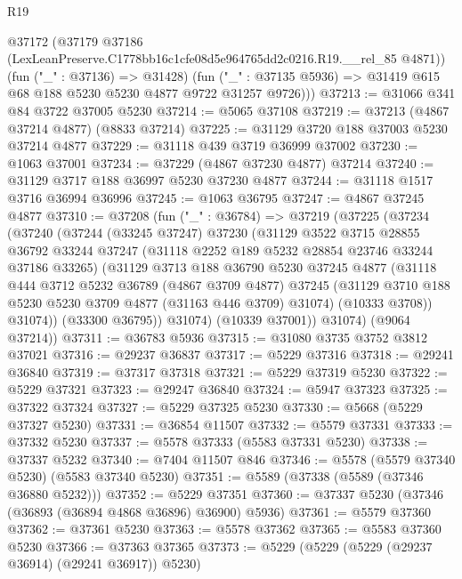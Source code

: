 \begin{lexlean}{R19}
\begin{coremodule}
      @37172
        (@37179 @37186 (LexLeanPreserve.C1778bb16c1cfe08d5e964765dd2c0216.R19.__rel_85 @4871))
        (fun ("_" : @37136) => @31428)
        (fun ("_" : @37135 @5936) => @31419 @615 @68 @188 @5230 @5230 @4877 @9722 @31257 @9726)))
@37213 := @31066 @341 @84 @3722 @37005 @5230
@37214 := @5065 @37108
@37219 := @37213 (@4867 @37214 @4877) (@8833 @37214)
@37225 := @31129 @3720 @188 @37003 @5230 @37214 @4877
@37229 := @31118 @439 @3719 @36999 @37002
@37230 := @1063 @37001
@37234 := @37229 (@4867 @37230 @4877) @37214
@37240 := @31129 @3717 @188 @36997 @5230 @37230 @4877
@37244 := @31118 @1517 @3716 @36994 @36996
@37245 := @1063 @36795
@37247 := @4867 @37245 @4877
@37310 := @37208
    (fun ("_" : @36784) =>
    @37219
      (@37225
        (@37234
          (@37240
            (@37244
              (@33245 @37247)
              @37230
              (@31129
                @3522
                @3715
                @28855
                @36792
                @33244
                @37247
                (@31118 @2252 @189 @5232 @28854 @23746 @33244 @37186 @33265)
                (@31129
                  @3713
                  @188
                  @36790
                  @5230
                  @37245
                  @4877
                  (@31118
                    @444
                    @3712
                    @5232
                    @36789
                    (@4867 @3709 @4877)
                    @37245
                    (@31129 @3710 @188 @5230 @5230 @3709 @4877 (@31163 @446 @3709) @31074)
                    (@10333 @3708))
                  @31074))
              (@33300 @36795))
            @31074)
          (@10339 @37001))
        @31074)
      (@9064 @37214))
@37311 := @36783 @5936
@37315 := @31080 @3735 @3752 @3812 @37021
@37316 := @29237 @36837
@37317 := @5229 @37316
@37318 := @29241 @36840
@37319 := @37317 @37318
@37321 := @5229 @37319 @5230
@37322 := @5229 @37321
@37323 := @29247 @36840
@37324 := @5947 @37323
@37325 := @37322 @37324
@37327 := @5229 @37325 @5230
@37330 := @5668 (@5229 @37327 @5230)
@37331 := @36854 @11507
@37332 := @5579 @37331
@37333 := @37332 @5230
@37337 := @5578 @37333 (@5583 @37331 @5230)
@37338 := @37337 @5232
@37340 := @7404 @11507 @846
@37346 := @5578 (@5579 @37340 @5230) (@5583 @37340 @5230)
@37351 := @5589 (@37338 (@5589 (@37346 @36880 @5232)))
@37352 := @5229 @37351
@37360 := @37337 @5230 (@37346 (@36893 (@36894 @4868 @36896) @36900) @5936)
@37361 := @5579 @37360
@37362 := @37361 @5230
@37363 := @5578 @37362
@37365 := @5583 @37360 @5230
@37366 := @37363 @37365
@37373 := @5229 (@5229 (@5229 (@29237 @36914) (@29241 @36917)) @5230)

\end{coremodule}
\end{lexlean}

